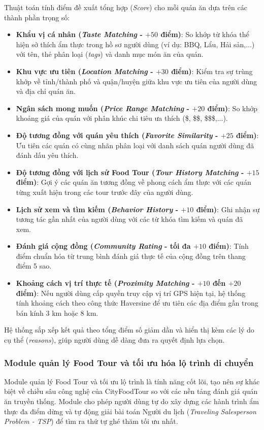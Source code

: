Thuật toán tính điểm đề xuất tổng hợp (\textit{Score}) cho mỗi quán ăn dựa trên các thành phần trọng số:
\begin{itemize}[label=\textbullet]
    \item \textbf{Khẩu vị cá nhân (\textit{Taste Matching} - $+50$ điểm)}: So khớp từ khóa thể hiện sở thích ẩm thực trong hồ sơ người dùng (ví dụ: BBQ, Lẩu, Hải sản,...) với tên, thẻ phân loại (\textit{tags}) và danh mục món ăn của quán.
    \item \textbf{Khu vực ưu tiên (\textit{Location Matching} - $+30$ điểm)}: Kiểm tra sự trùng khớp về tỉnh/thành phố và quận/huyện giữa khu vực ưu tiên của người dùng và địa chỉ quán ăn.
    \item \textbf{Ngân sách mong muốn (\textit{Price Range Matching} - $+20$ điểm)}: So khớp khoảng giá của quán với phân khúc chi tiêu ưa thích (\$, \$\$, \$\$\$,...).
    \item \textbf{Độ tương đồng với quán yêu thích (\textit{Favorite Similarity} - $+25$ điểm)}: Ưu tiên các quán có cùng nhãn phân loại với danh sách quán người dùng đã đánh dấu yêu thích.
    \item \textbf{Độ tương đồng với lịch sử Food Tour (\textit{Tour History Matching} - $+15$ điểm)}: Gợi ý các quán ăn tương đồng về phong cách ẩm thực với các quán từng xuất hiện trong các tour trước đây của người dùng.
    \item \textbf{Lịch sử xem và tìm kiếm (\textit{Behavior History} - $+10$ điểm)}: Ghi nhận sự tương tác gần nhất của người dùng với các từ khóa tìm kiếm và quán đã xem.
    \item \textbf{Đánh giá cộng đồng (\textit{Community Rating} - tối đa $+10$ điểm)}: Tính điểm chuẩn hóa từ trung bình đánh giá thực tế của cộng đồng trên thang điểm 5 sao.
    \item \textbf{Khoảng cách vị trí thực tế (\textit{Proximity Matching} - $+10$ đến $+20$ điểm)}: Nếu người dùng cấp quyền truy cập vị trí GPS hiện tại, hệ thống tính khoảng cách theo công thức Haversine để ưu tiên các địa điểm gần trong bán kính $3$ km hoặc $8$ km.
\end{itemize}

Hệ thống sắp xếp kết quả theo tổng điểm số giảm dần và hiển thị kèm các lý do cụ thể (\textit{reasons}), giúp người dùng dễ dàng đưa ra quyết định lựa chọn.

\subsubsection{Module quản lý Food Tour và tối ưu hóa lộ trình di chuyển}
Module quản lý Food Tour và tối ưu lộ trình là tính năng cốt lõi, tạo nên sự khác biệt về chiều sâu công nghệ của CityFoodTour so với các nền tảng đánh giá quán ăn truyền thống. Module cho phép người dùng tự do xây dựng các hành trình ẩm thực đa điểm dừng và tự động giải bài toán Người du lịch (\textit{Traveling Salesperson Problem - TSP}) để tìm ra thứ tự ghé thăm tối ưu nhất.

